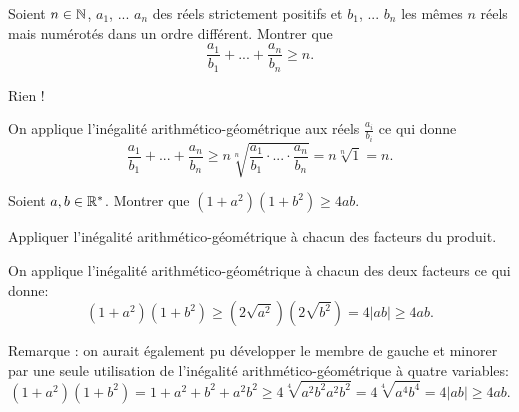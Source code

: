 \begin{exo}[Mélange]
Soient $n\in \mathbb N$, $a_1$, ... $a_n$ des réels strictement positifs et $b_1$, ... $b_n$ les mêmes $n$ réels mais numérotés dans un ordre différent. Montrer que
\[
\frac{a_1}{b_1} + ... + \frac{a_n}{b_n} \geq n.
\]
 
 \begin{hint}
 Rien !
 \end{hint}

\begin{sol} 
On applique l'inégalité arithmético-géométrique aux réels $\frac{a_i}{b_i}$ ce qui donne
\[ \frac{a_1}{b_1} + ... + \frac{a_n}{b_n}
\geq n\sqrt[n]{\frac{a_1}{b_1} \cdot ... \cdot \frac{a_n}{b_n}}
=n \sqrt[n]{1}=n.
\]
\end{sol}  
\end{exo}

\begin{exo}[Un produit]
Soient $a, b \in \mathbb R^*$. Montrer que $(1+a^2)(1+b^2) \geq 4ab$.
 
\begin{hint}
Appliquer l'inégalité arithmético-géométrique à chacun des facteurs du produit.
\end{hint}

\begin{sol} 
On applique l'inégalité arithmético-géométrique à chacun des deux facteurs ce qui donne:
\[
(1+a^2)(1+b^2) \geq 
(2\sqrt{a^2})(2\sqrt{b^2})
= 4|ab| \geq  4ab.
\]

Remarque : on aurait également pu développer le membre de gauche et minorer par une seule utilisation de l'inégalité arithmético-géométrique à quatre variables:
\[
(1+a^2)(1+b^2) 
=1+a^2+b^2+a^2b^2
\geq  
4\sqrt[4]{a^2b^2a^2b^2} =4\sqrt[4]{a^4b^4}
= 4|ab| \geq 4ab.
\]
\end{sol}  
\end{exo}



